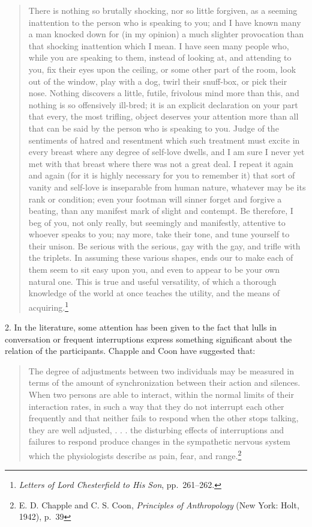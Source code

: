 \documentclass[openany,nobib]{tufte-book}
\begin{document}
\begin{quote}
There is nothing so brutally shocking, nor so little forgiven, as a
seeming inattention to the person who is speaking to you; and I have
known many a man knocked down for (in my opinion) a much slighter
provocation than that shocking inattention which I mean. I have seen
many people who, while you are speaking to them, instead of looking at,
and attending to you, fix their eyes upon the ceiling, or some other
part of the room, look out of the window, play with a dog, twirl their
snuff-box, or pick their nose. Nothing discovers a little, futile,
frivolous mind more than this, and nothing is so offensively ill-bred;
it is an explicit declaration on your part that every, the most
trifling, object deserves your attention more than all that can be said
by the person who is speaking to you. Judge of the sentiments of hatred
and resentment which such treatment must excite in every breast where
any degree of self-love dwells, and I am sure I never yet met with that
breast where there was not a great deal. I repeat it again and again
(for it is highly necessary for you to remember it) that sort of vanity
and self-love is inseparable from human nature, whatever may be its rank
or condition; even your footman will sinner forget and forgive a
beating, than any manifest mark of slight and contempt. Be therefore, I
beg of you, not only really, but seemingly and manifestly, attentive to
whoever speaks to you; nay more, take their tone, and tune yourself to
their unison. Be serious with the serious, gay with the gay, and trifle
with the triplets. In assuming these various shapes, ends our to make
each of them seem to sit easy upon you, and even to appear to be your
own natural one. This is true and useful versatility, of which a
thorough knowledge of the world at once teaches the utility, and the
means of acquiring.\footnote{\emph{Letters of Lord Chesterfield to His
  Son}, pp.~261--262.}
\end{quote}

2. In the literature, some attention has been given to the
fact that lulls in conversation or frequent interruptions express
something significant about the relation of the participants. Chapple
and Coon have suggested that:

\begin{quote}
The degree of adjustments between two individuals may be measured in
terms of the amount of synchronization between their action and
silences. When two persons are able to interact, within the normal
limits of their interaction rates, in such a way that they do not
interrupt each other frequently and that neither fails to respond when
the other stops talking, they are well adjusted, . . . the disturbing
effects of interruptions and failures to respond produce changes in the
sympathetic nervous system which the physiologists describe as pain,
fear, and range.\footnote{E. D. Chapple and C. S. Coon, \emph{Principles
  of Anthropology} (New York: Holt, 1942), p.~39}
\end{quote}
\end{document}
